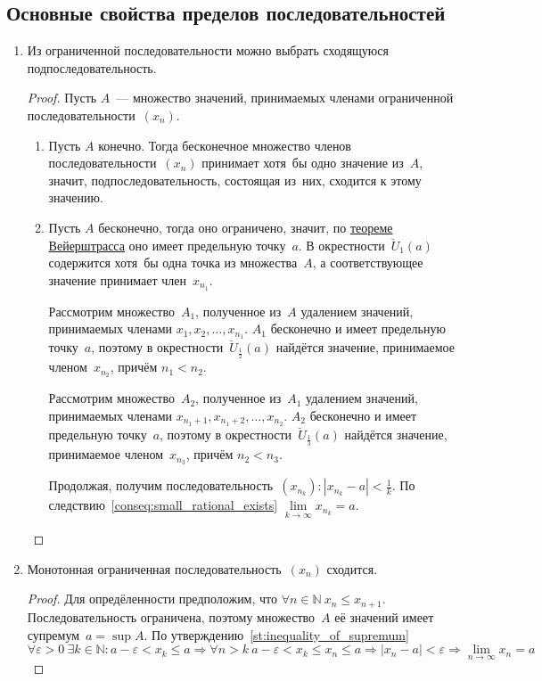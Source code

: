 \subsection{Основные свойства пределов последовательностей}
\begin{enumerate}
	\item Из ограниченной последовательности можно выбрать сходящуюся подпоследовательность.
	\begin{proof}
	Пусть $A$~--- множество значений, принимаемых членами ограниченной последовательности~$(x_n)$.
	\begin{enumerate}
		\item Пусть $A$ конечно.
		Тогда бесконечное множество членов последовательности~$(x_n)$ принимает хотя~бы одно значение из~$A$, значит, подпоследовательность, состоящая из~них, сходится к этому значению.
		
		\item Пусть $A$ бесконечно, тогда оно ограничено, значит, по \hyperref[th:Weierstrass]{теореме Вейерштрасса} оно имеет предельную точку~$a$.
		В окрестности~$\breve U_1(a)$ содержится хотя~бы одна точка из множества~$A$, а соответствующее значение принимает член~$x_{n_1}$.
		
		Рассмотрим множество~$A_1$, полученное из~$A$ удалением значений, принимаемых членами $x_1, x_2, \ldots, x_{n_1}$.
		$A_1$ бесконечно и имеет предельную точку~$a$, поэтому в окрестности~$\breve U_\frac12(a)$ найдётся значение, принимаемое членом~$x_{n_2}$, причём $n_1 < n_2$.
		
		Рассмотрим множество~$A_2$, полученное из~$A_1$ удалением значений, принимаемых членами $x_{n_1 + 1}, x_{n_1 + 2}, \allowbreak \ldots, x_{n_2}$.
		$A_2$ бесконечно и имеет предельную точку~$a$, поэтому в окрестности~$\breve U_\frac13(a)$ найдётся значение, принимаемое членом~$x_{n_3}$, причём $n_2 < n_3$.
		
		Продолжая, получим последовательность~$(x_{n_k}) \colon |x_{n_k} - a| < \frac1k$. По следствию~\ref{conseq:small_rational_exists} $\lim\limits_{k \to \infty} x_{n_k} = a$.
	\end{enumerate}
	\end{proof}
	
	\item Монотонная ограниченная последовательность~$(x_n)$ сходится.
	\begin{proof}
	Для опредёленности предположим, что $\forall n \in \mathbb N \ x_n \leqslant x_{n+1}$.
	Последовательность ограничена, поэтому множество~$A$ её значений имеет супремум~$a = \sup A$.
	По утверждению~\ref{st:inequality_of_supremum}
	\begin{equation*}
	\forall \varepsilon > 0 \ \exists k \in \mathbb N \colon a - \varepsilon < x_k \leqslant a \Rightarrow
	\forall n > k \ a - \varepsilon < x_k \leqslant x_n \leqslant a \Rightarrow
	|x_n - a| < \varepsilon \Rightarrow \lim_{n \to \infty} x_n = a
	\end{equation*}
	\end{proof}
	

\end{enumerate}
